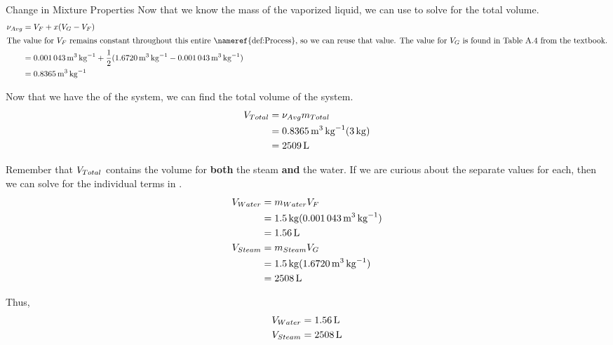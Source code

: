 \begin{example}{Change in Mixture Properties}
  Now that we know the mass of the vaporized liquid, we can use  to solve for the total volume.
  \begin{align*}
    \AvgSpecificVol &= \SaturatedFluidVol + \Quality(\SaturatedVaporVol - \SaturatedFluidVol) \\
    \intertext{The value for $\SaturatedFluidVol$ remains constant throughout this entire \nameref{def:Process}, so we can reuse that value. The value for $\SaturatedVaporVol$ is found in Table A.4 from the textbook.}
                    &= \SI{0.001043}{\meter\cubed\per\kilo\gram} + \frac{1}{2} (\SI{1.6720}{\meter\cubed\per\kilo\gram} - \SI{0.001043}{\meter\cubed\per\kilo\gram}) \\
                    &= \SI{0.8365}{\meter\cubed\per\kilo\gram}
  \end{align*}

  Now that we have the  of the system, we can find the total volume of the system.
  \begin{align*}
    V_{Total} &= \nu_{Avg} m_{Total} \\
                    &= \SI{0.8365}{\meter\cubed\per\kilo\gram} (\SI{3}{\kilo\gram}) \\
                    &= \SI{2509}{\liter}
  \end{align*}

  Remember that $V_{Total}$ contains the volume for \textbf{both} the steam \textbf{and} the water.
  If we are curious about the separate values for each, then we can solve for the individual terms in .
  \begin{align*}
    V_{Water} &= m_{Water} V_{F} \\
                    &= \SI{1.5}{\kilo\gram} (\SI{0.001043}{\meter\cubed\per\kilo\gram}) \\
                    &= \SI{1.56}{\liter} \\
    V_{Steam} &= m_{Steam} V_{G} \\
                    &= \SI{1.5}{\kilo\gram} (\SI{1.6720}{\meter\cubed\per\kilo\gram}) \\
                    &= \SI{2508}{\liter}
  \end{align*}

  Thus,
  \begin{align*}
    V_{Water} &=  \SI{1.56}{\liter} \\
    V_{Steam} &= \SI{2508}{\liter}
  \end{align*}


\end{example}
